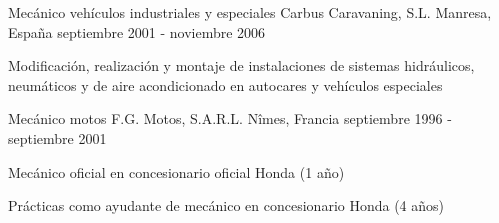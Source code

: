 \begin{cventries}
  \cventry
    {Mecánico vehículos industriales y especiales} %
    {Carbus Caravaning, S.L.} %
    {Manresa, España} %
    {septiembre 2001 - noviembre 2006} %
    {
      \begin{cvitems} %
        \item {Modificación, realización y montaje de instalaciones de sistemas hidráulicos, neumáticos y de aire acondicionado en autocares y vehículos especiales}
      \end{cvitems}
    }

  \cventry
    {Mecánico motos} %
    {F.G. Motos, S.A.R.L.} %
    {Nîmes, Francia} %
    {septiembre 1996 - septiembre 2001} %
    {
      \begin{cvitems} %
        \item {Mecánico oficial en concesionario oficial Honda (1 año)}
        \item {Prácticas como ayudante de mecánico en concesionario Honda (4 años)}
      \end{cvitems}
    }

\end{cventries}
